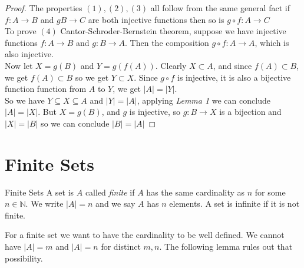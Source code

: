 \documentclass[16pt,a4paper]{article}
\theoremstyle{definition}
\begin{document}
\begin{proof}
The properties $(1), (2), (3)$ all follow from the same general fact if $f:A\rightarrow B$ and $gB \rightarrow C$ are both injective functions then so is $g\circ f: A\rightarrow C$
\\

To prove $(4)$ Cantor-Schroder-Bernstein theorem, suppose we have injective functions $f:A\rightarrow B$ and $g:B\rightarrow A$. Then the composition $g\circ f: A\rightarrow A$, which is also injective. \\
Now let $X = g(B)$ and $Y = g(f(A))$. Clearly $X\subset A$, and since $f(A)\subset B$, we get $f(A) \subset B$  so we get $Y \subset X$. Since $g\circ f$ is injective, it is also a bijective function function from $A$ to $Y$, we get $|A| = |Y|$. \\

So we have $Y\subseteq X \subseteq A$ and $|Y| = |A|$, applying \textit{Lemma 1} we can conclude $|A| = |X|$. But $X = g(B)$, and $g$ is injective, so $g:B\rightarrow X$ is a bijection and $|X| = |B|$ so we can conclude $|B| = |A|$


\end{proof}




\newpage
\section{Finite Sets}

\begin{defn}{Finite Sets}{}
A set is $A$ called \textit{finite} if $A$ has the same cardinality as $n$ for some $n\in \mathbb{N}$. We write $|A| = n$ and we say $A$ has $n$ elements. A set is infinite if it is not finite. 
\end{defn}

For a finite set we want to have the cardinality to be well defined. We cannot have $|A| = m$ and $|A| = n$ for distinct $m,n$. The following lemma rules out that possibility. 
\end{document}
